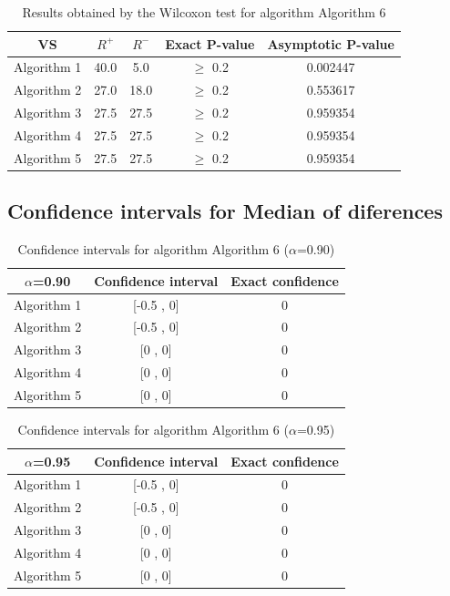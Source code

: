 \documentclass[a4paper,10pt]{article}
\begin{document}
\begin{table}[!htp]
\centering\small
\begin{tabular}{
|c|c|c|c|c|}
\hline
 VS & $R^{+}$ & $R^{-}$ & Exact P-value & Asymptotic P-value \\ \hline 
Algorithm 1 & 40.0 & 5.0 & $\geq$ 0.2 & 0.002447\\ \hline 
Algorithm 2 & 27.0 & 18.0 & $\geq$ 0.2 & 0.553617\\ \hline 
Algorithm 3 & 27.5 & 27.5 & $\geq$ 0.2 & 0.959354\\ \hline 
Algorithm 4 & 27.5 & 27.5 & $\geq$ 0.2 & 0.959354\\ \hline 
Algorithm 5 & 27.5 & 27.5 & $\geq$ 0.2 & 0.959354\\ \hline 

\end{tabular}
\caption{Results obtained by the Wilcoxon test for algorithm Algorithm 6}
\end{table}

\subsection{Confidence intervals for Median of diferences}

\begin{table}[!htp]
\centering\small
\begin{tabular}{
|c|c|c|}
\hline
 $\alpha$=0.90 & Confidence interval & Exact confidence \\ \hline 
Algorithm 1 & [-0.5 , 0] & 0\\ \hline 
Algorithm 2 & [-0.5 , 0] & 0\\ \hline 
Algorithm 3 & [0 , 0] & 0\\ \hline 
Algorithm 4 & [0 , 0] & 0\\ \hline 
Algorithm 5 & [0 , 0] & 0\\ \hline 

\end{tabular}
\caption{Confidence intervals for algorithm Algorithm 6 ($\alpha$=0.90)}
\end{table}
\begin{table}[!htp]
\centering\small
\begin{tabular}{
|c|c|c|}
\hline
 $\alpha$=0.95 & Confidence interval & Exact confidence \\ \hline 
Algorithm 1 & [-0.5 , 0] & 0\\ \hline 
Algorithm 2 & [-0.5 , 0] & 0\\ \hline 
Algorithm 3 & [0 , 0] & 0\\ \hline 
Algorithm 4 & [0 , 0] & 0\\ \hline 
Algorithm 5 & [0 , 0] & 0\\ \hline 

\end{tabular}
\caption{Confidence intervals for algorithm Algorithm 6 ($\alpha$=0.95)}
\end{table}

 \clearpage 
\end{document}
